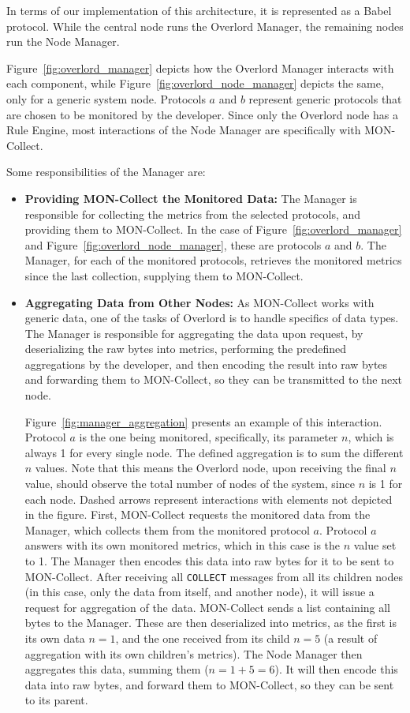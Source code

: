 In terms of our implementation of this architecture, it is represented as a Babel protocol. While the central node runs the Overlord Manager, the remaining nodes run the Node Manager.

Figure~\ref{fig:overlord_manager} depicts how the Overlord Manager interacts with each component, while Figure~\ref{fig:overlord_node_manager} depicts the same, only for a generic system node. Protocols $a$ and $b$ represent generic protocols that are chosen to be monitored by the developer. Since only the Overlord node has a Rule Engine, most interactions of the Node Manager are specifically with MON-Collect. 

Some responsibilities of the Manager are:
\begin{itemize}
	\item \textbf{Providing MON-Collect the Monitored Data:} The Manager is responsible for collecting the metrics from the selected protocols, and providing them to MON-Collect. In the case of Figure~\ref{fig:overlord_manager} and Figure~\ref{fig:overlord_node_manager}, these are protocols $a$ and $b$. The Manager, for each of the monitored protocols, retrieves the monitored metrics since the last collection, supplying them to MON-Collect.
	\item \textbf{Aggregating Data from Other Nodes:} As MON-Collect works with generic data, one of the tasks of Overlord is to handle specifics of data types. The Manager is responsible for aggregating the data upon request, by deserializing the raw bytes into metrics, performing the predefined aggregations by the developer, and then encoding the result into raw bytes and forwarding them to MON-Collect, so they can be transmitted to the next node.
	
	Figure~\ref{fig:manager_aggregation} presents an example of this interaction. Protocol $a$ is the one being monitored, specifically, its parameter $n$, which is always 1 for every single node. The defined aggregation is to sum the different $n$ values. Note that this means the Overlord node, upon receiving the final $n$ value, should observe the total number of nodes of the system, since $n$ is 1 for each node. Dashed arrows represent interactions with elements not depicted in the figure. First,  MON-Collect requests the monitored data from the Manager, which collects them from the monitored protocol $a$. Protocol $a$ answers with its own monitored metrics, which in this case is the $n$ value set to 1. The Manager then encodes this data into raw bytes for it to be sent to MON-Collect. After receiving all \texttt{COLLECT} messages from all its children nodes (in this case, only the data from itself, and another node), it will issue a request for aggregation of the data. MON-Collect sends a list containing all bytes to the Manager. These are then deserialized into metrics, as the first is its own data $n = 1$, and the one received from its child $n = 5$ (a result of aggregation with its own children's metrics). The Node Manager then aggregates this data, summing them ($ n = 1 + 5 = 6$). It will then encode this data into raw bytes, and forward them to MON-Collect, so they can be sent to its parent.
	

\end{itemize}
